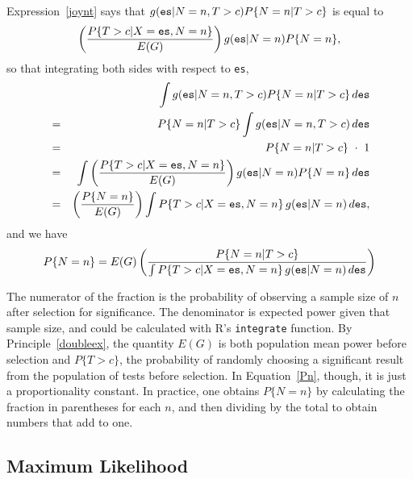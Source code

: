 \documentclass[jou]{apa6} %
\newcommand{\R}[1]{\mbox{\texttt{#1}}} %
\begin{document}
Expression~\ref{joynt} says that $g(\R{es}|N=n,T>c)P\{N=n|T>c\}$ is equal to
{\small
\begin{displaymath} 
    \left( \frac{ P\{T>c|X=\R{es},N=n\} }{E(G)} \right) g(\R{es}|N=n)P\{N=n\},
\end{displaymath}
} %
so that integrating both sides with respect to \texttt{es},
{\small
\begin{eqnarray*} 
    &&  \int g(\R{es}|N=n,T>c)P\{N=n|T>c\} \, d\R{es} \\
    &=& P\{N=n|T>c\} \int g(\R{es}|N=n,T>c) \, d\R{es} \\
    &=& P\{N=n|T>c\} ~ \cdot ~ 1 \\
    &=& \int \left( \frac{ P\{T>c|X=\R{es},N=n\} }{E(G)} \right) 
        g(\R{es}|N=n)P\{N=n\} \, d\R{es} \\
    &=& \left(\frac{P\{N=n\}}{E(G)} \right) 
        \int  P\{T>c|X=\R{es},N=n\} \, g(\R{es}|N=n) \, d\R{es}, \\
\end{eqnarray*}
} %
and we have
{\small
\begin{equation} \label{Pn}
    P\{N=n\} = E(G) \left(\frac{P\{N=n|T>c\}}
               {\int P\{T>c|X=\R{es},N=n\}\,g(\R{es}|N=n)\,d\R{es} }
                   \right)
\end{equation}
} %

The numerator of the fraction is the probability of observing a sample size of $n$ after selection for significance. The denominator is expected power given that sample size, and could be calculated with R's \texttt{integrate} function. By Principle~\ref{doubleex}, the quantity $E(G)$ is both population mean power before selection and $P\{T>c\}$, the probability of randomly choosing a significant result from the population of tests before selection. In Equation~\ref{Pn}, though, it is just a proportionality constant. In practice, one obtains $P\{N=n\}$ by calculating the fraction in parentheses for each $n$, and then dividing by the total to obtain numbers that add to one.

\subsection*{Maximum Likelihood}
\end{document}
